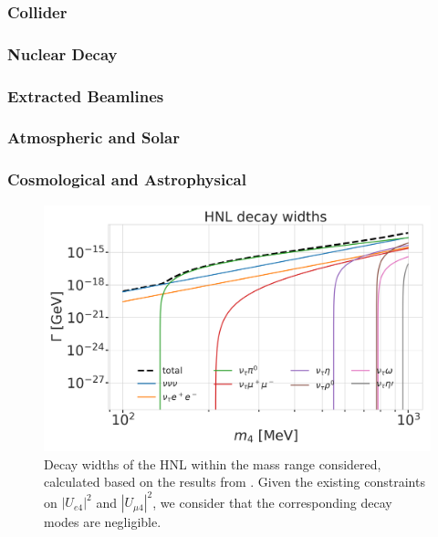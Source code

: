 \subsubsection{Collider}

\subsubsection{Nuclear Decay}

\subsubsection{Extracted Beamlines}

\subsubsection{Atmospheric and Solar}

\subsubsection{Cosmological and Astrophysical}



\begin{figure}
    \includegraphics{figures/hnl_simulation/decay_theory/hnl_decay_widths_up_to_1.0_GeV_log.png}
    \caption[HNL decay widths]{Decay widths of the HNL within the mass range considered, calculated based on the results from \cite{Coloma:2020lgy}. Given the existing constraints on $|U_{e4}|^{2}$ and $|U_{\mu4}|^{2}$, we consider that the corresponding decay modes are negligible.}
\end{figure}


